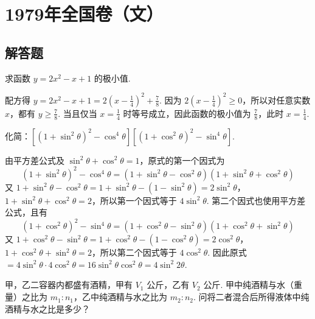 \documentclass[UTF8,a4paper,oneside,11pt]{ctexbook}
\begin{document}
\mainmatter

\chapter{1979年全国卷（文）}
\section{解答题}

\begin{problem}
求函数 \(y = 2x^{2} - x + 1\) 的极小值.
\end{problem}

\begin{solution}
配方得 \(y=2x^{2}-x+1=2\left(x-\frac{1}{4}\right)^{2}+\frac{7}{8}\). 因为 \(2\left(x-\frac{1}{4}\right)^{2}\geqslant0\)，所以对任意实数 \(x\)，都有 \(y\geqslant\frac{7}{8}\). 当且仅当 \(x=\frac{1}{4}\) 时等号成立，因此函数的极小值为 \(\frac{7}{8}\)，此时 \(x=\frac{1}{4}\).
\end{solution}

\begin{problem}
化简：\(\left[(1 + \sin^2\theta)^2 - \cos^4\theta\right]\left[(1 + \cos^2\theta)^2 - \sin^4\theta\right]\).
\end{problem}

\begin{solution}
由平方差公式及 \(\sin^2\theta+\cos^2\theta=1\)，原式的第一个因式为
\[
(1+\sin^2\theta)^2-\cos^4\theta=(1+\sin^2\theta-\cos^2\theta)(1+\sin^2\theta+\cos^2\theta)
\]
又 \(1+\sin^2\theta-\cos^2\theta=1+\sin^2\theta-(1-\sin^2\theta)=2\sin^2\theta\)，\(1+\sin^2\theta+\cos^2\theta=2\)，所以第一个因式等于 \(4\sin^2\theta\). 第二个因式也使用平方差公式，且有
\[
(1+\cos^2\theta)^2-\sin^4\theta=(1+\cos^2\theta-\sin^2\theta)(1+\cos^2\theta+\sin^2\theta)
\]
又 \(1+\cos^2\theta-\sin^2\theta=1+\cos^2\theta-(1-\cos^2\theta)=2\cos^2\theta\)，\(1+\cos^2\theta+\sin^2\theta=2\)，所以第二个因式等于 \(4\cos^2\theta\).
因此原式 \(=4\sin^2\theta\cdot4\cos^2\theta=16\sin^2\theta\cos^2\theta=4\sin^2 2\theta\).
\end{solution}

\begin{problem}
甲，乙二容器内都盛有酒精，甲有 \(V_{1}\text{ 公斤}\)，乙有 \(V_{2}\text{ 公斤}\). 甲中纯酒精与水（重量）之比为 \(m_{1}:n_{1}\)，乙中纯酒精与水之比为 \(m_{2}:n_{2}\). 问将二者混合后所得液体中纯酒精与水之比是多少？
\end{problem}
\end{document}
